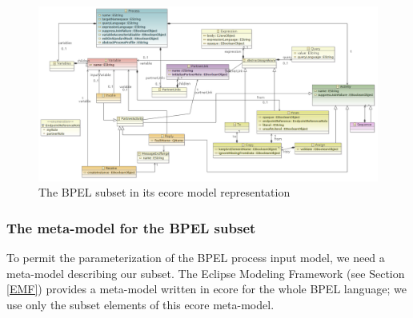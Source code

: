 \begin{figure}
  \begin{center}
    \includegraphics[scale=0.67,angle=90]{pictures/SubSetBpel2.png}
    \caption{The BPEL subset in its ecore model representation}
    \label{fig:SubSetBPEL}
  \end{center}
\end{figure} 

\subsubsection{The meta-model for the BPEL subset}
\label{Sec:DesignBpelSubset}
To permit the parameterization of the BPEL process input model, we need a meta-model describing our subset. The Eclipse Modeling Framework (see Section \ref{EMF}) provides a meta-model written in ecore for the whole BPEL language; we use only the subset elements of this ecore meta-model.
